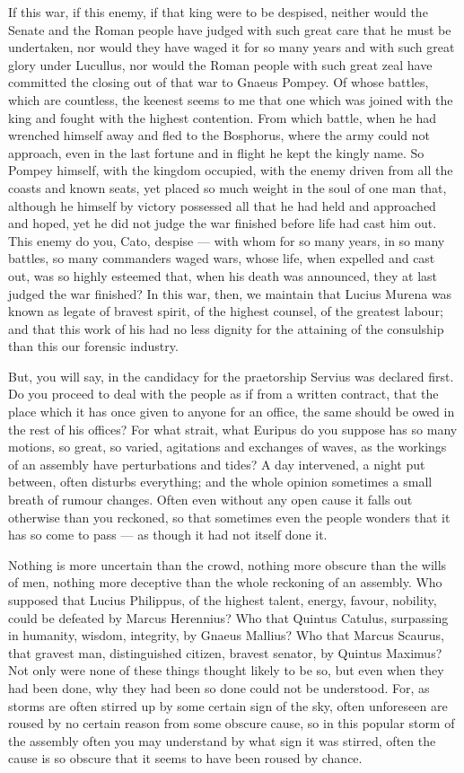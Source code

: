  If this war, if this enemy, if that king were to be despised, neither would the Senate and the Roman people have judged with such great care that he must be undertaken, nor would they have waged it for so many years and with such great glory under Lucullus, nor would the Roman people with such great zeal have committed the closing out of that war to Gnaeus Pompey. Of whose battles, which are countless, the keenest seems to me that one which was joined with the king and fought with the highest contention. From which battle, when he had wrenched himself away and fled to the Bosphorus, where the army could not approach, even in the last fortune and in flight he kept the kingly name. So Pompey himself, with the kingdom occupied, with the enemy driven from all the coasts and known seats, yet placed so much weight in the soul of one man that, although he himself by victory possessed all that he had held and approached and hoped, yet he did not judge the war finished before life had cast him out. This enemy do you, Cato, despise --- with whom for so many years, in so many battles, so many commanders waged wars, whose life, when expelled and cast out, was so highly esteemed that, when his death was announced, they at last judged the war finished? In this war, then, we maintain that Lucius Murena was known as legate of bravest spirit, of the highest counsel, of the greatest labour; and that this work of his had no less dignity for the attaining of the consulship than this our forensic industry.

 But, you will say, in the candidacy for the praetorship Servius was declared first. Do you proceed to deal with the people as if from a written contract, that the place which it has once given to anyone for an office, the same should be owed in the rest of his offices? For what strait, what Euripus do you suppose has so many motions, so great, so varied, agitations and exchanges of waves, as the workings of an assembly have perturbations and tides? A day intervened, a night put between, often disturbs everything; and the whole opinion sometimes a small breath of rumour changes. Often even without any open cause it falls out otherwise than you reckoned, so that sometimes even the people wonders that it has so come to pass --- as though it had not itself done it.

 Nothing is more uncertain than the crowd, nothing more obscure than the wills of men, nothing more deceptive than the whole reckoning of an assembly. Who supposed that Lucius Philippus, of the highest talent, energy, favour, nobility, could be defeated by Marcus Herennius? Who that Quintus Catulus, surpassing in humanity, wisdom, integrity, by Gnaeus Mallius? Who that Marcus Scaurus, that gravest man, distinguished citizen, bravest senator, by Quintus Maximus? Not only were none of these things thought likely to be so, but even when they had been done, why they had been so done could not be understood. For, as storms are often stirred up by some certain sign of the sky, often unforeseen are roused by no certain reason from some obscure cause, so in this popular storm of the assembly often you may understand by what sign it was stirred, often the cause is so obscure that it seems to have been roused by chance.

